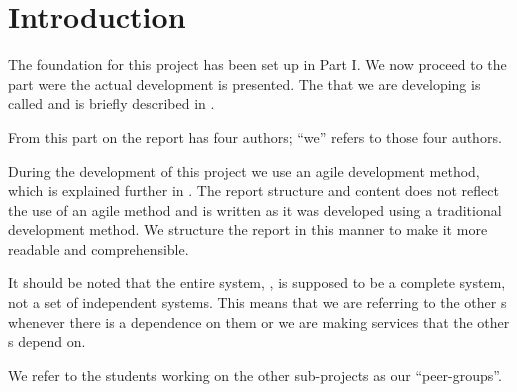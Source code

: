 \chapter{Introduction}
\label{chap:introProjectgroup}
The foundation for this project has been set up in Part I.
We now proceed to the part were the actual development is presented.
The \subsystem{} that we are developing is called \administrationgroup{} and is briefly described in .



From this part on the report has four authors; ``we'' refers to those four authors.

During the development of this project we use an agile development method, which is explained further in . 
The report structure and content does not reflect the use of an agile method and is written as it was developed using a traditional development method. 
We structure the report in this manner to make it more readable and comprehensible. 

It should be noted that the entire system, \system{}, is supposed to be a complete system, not a set of independent systems.
This means that we are referring to the other \subsystem{}s whenever there is a dependence on them or we are making services that the other \subsystem{}s depend on.

We refer to the students working on the other sub-projects as our ``peer-groups''.



